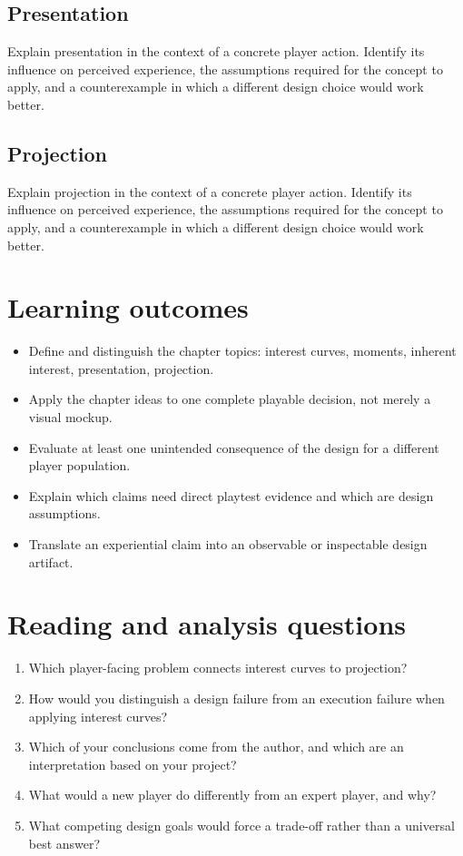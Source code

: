 \documentclass[11pt]{article}
\begin{document}
\subsection{Presentation}
Explain presentation in the context of a concrete player action. Identify its influence on perceived experience, the assumptions required for the concept to apply, and a counterexample in which a different design choice would work better.


\subsection{Projection}
Explain projection in the context of a concrete player action. Identify its influence on perceived experience, the assumptions required for the concept to apply, and a counterexample in which a different design choice would work better.


\section{Learning outcomes}
\begin{itemize}
\item Define and distinguish the chapter topics: interest curves, moments, inherent interest, presentation, projection.
\item Apply the chapter ideas to one complete playable decision, not merely a visual mockup.
\item Evaluate at least one unintended consequence of the design for a different player population.
\item Explain which claims need direct playtest evidence and which are design assumptions.
\item Translate an experiential claim into an observable or inspectable design artifact.
\end{itemize}

\section{Reading and analysis questions}
\begin{enumerate}
\item Which player-facing problem connects interest curves to projection?
\item How would you distinguish a design failure from an execution failure when applying interest curves?
\item Which of your conclusions come from the author, and which are an interpretation based on your project?
\item What would a new player do differently from an expert player, and why?
\item What competing design goals would force a trade-off rather than a universal best answer?
\end{enumerate}
\end{document}
